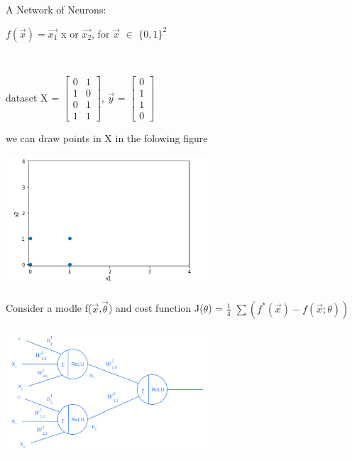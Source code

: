 \begin{example}
    A Network of Neurons: \\
    \centerline{$f(\Vec{x})=\Vec{x_1}$ x or $\Vec{x_2}$, for $\Vec{x}$ $\in$ $\{0,1\}^2$}\\
    
    \centerline{
       dataset X = $
       \begin{bmatrix}
        0 & 1\\
        1 & 0\\
        0 & 1\\
        1 & 1
    \end{bmatrix}
    $,
    $\Vec{y}$ = $ 
    \begin{bmatrix}
        0\\
        1\\
        1\\
        0
        \end{bmatrix}$}
we can draw points in X in the folowing figure


\begin{center}
    \includegraphics[width=3in]{images/Chapter 10/example1.png}
\end{center}




    Consider a modle f($\Vec{x}$,$\Vec{\theta}$) and cost function J($\theta$) = $\frac{1}{4}$ $\sum{(f^*(\Vec{x})-f(\Vec{x};\theta))}$

\begin{center}
    \includegraphics[width=3in]{images/Chapter 10/betterway.png}
\end{center}
    

\end{example}
